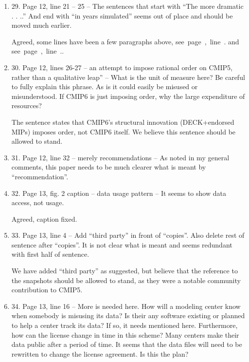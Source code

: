 \documentclass[gmd,manuscript]{copernicus}
\newcommand{\plref}[1]{\mbox{see page \pageref{p-#1}, line
    \lineref{l-#1}.}}
\newenvironment{answer}{\color{blue}}{}
\begin{document}
\begin{enumerate}[label=RC1-\arabic*,leftmargin=*]
  \begin{answer}
    \plref{RC1-27}
  \end{answer}
\item 29. Page 12, line 21 -- 25 -- The sentences that start with “The
  more dramatic . . ..” And end with “in years simulated” seems out of
  place and should be moved much earlier.

  \begin{answer}
    Agreed, some lines have been a few paragraphs above,
    \plref{RC1-29a} and \plref{RC1-29b}.
  \end{answer}
\item 30. Page 12, lines 26-27 -- an attempt to impose rational order
  on CMIP5, rather than a qualitative leap” -- What is the unit of
  measure here? Be careful to fully explain this phrase. As is it
  could easily be misused or misunderstood. If CMIP6 is just imposing
  order, why the large expenditure of resources?

  \begin{answer}
    The sentence states that CMIP6's structural innovation
    (DECK+endorsed MIPs) imposes order, not CMIP6 itself. We believe
    this sentence should be allowed to stand.
  \end{answer}
\item 31. Page 12, line 32 -- merely recommendations -- As noted in my
  general comments, this paper needs to be much clearer what is meant
  by “recommendation”.
\item 32. Page 13, fig. 2 caption -- data usage pattern -- It seems to
  show data access, not usage.

  \begin{answer}
    Agreed, caption fixed.
  \end{answer}
\item 33. Page 13, line 4 -- Add “third party” in front of “copies”.
  Also delete rest of sentence after “copies”. It is not clear what is
  meant and seems redundant with first half of sentence.

  \begin{answer}
    We have added ``third party'' as suggested, but believe that the
    reference to the snapshots should be allowed to stand, as they
    were a notable community contribution to CMIP5.
  \end{answer}
\item 34. Page 13, line 16 -- More is needed here. How will a modeling
  center know when somebody is misusing its data? Is their any
  software existing or planned to help a center track its data? If so,
  it needs mentioned here. Furthermore, how can the license change in
  time in this scheme? Many centers make their data public after a
  period of time. It seems that the data files will need to be
  rewritten to change the license agreement. Is this the plan?


\end{enumerate}
\end{document}
